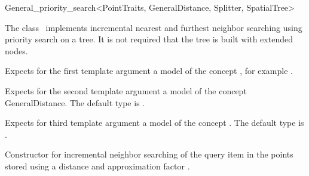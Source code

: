 

\begin{ccRefClass}{General_priority_search<PointTraits, GeneralDistance, Splitter, SpatialTree>}


\ccDefinition

The class \ccRefName\ implements incremental nearest and furthest neighbor searching
using priority search on a tree. It is not required that the tree is
built with extended nodes.


\ccParameters

Expects for the first template argument a model of the concept ,
for example .

Expects for the second template argument a model of the
concept GeneralDistance. The default type is 
.


Expects for third template argument a model of the concept .
The default type is .

\ccTypes





\ccCreation
{}  %


\def\ccLongParamLayout{\ccTrue}
{Constructor for incremental neighbor searching of the query item 
in the points stored  using a distance  and approximation factor . }


\end{ccRefClass}
